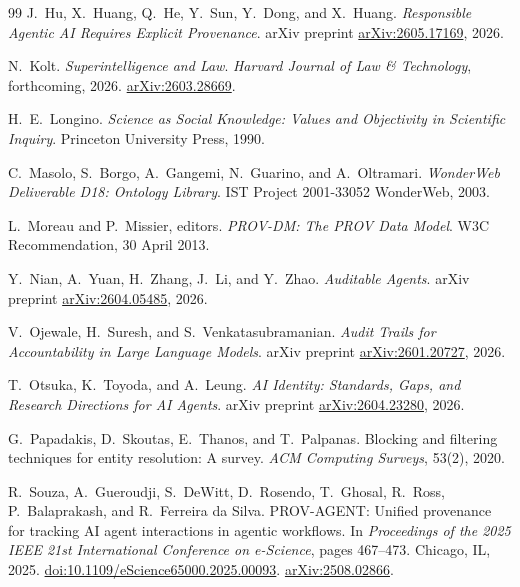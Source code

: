 \documentclass[11pt]{article}
\theoremstyle{plain}
\theoremstyle{definition}
\theoremstyle{remark}
\begin{document}
\begin{thebibliography}{99}
  J.\ Hu, X.\ Huang, Q.\ He, Y.\ Sun, Y.\ Dong, and X.\ Huang.
  \emph{Responsible Agentic AI Requires Explicit Provenance}.
  arXiv preprint \href{https://arxiv.org/abs/2605.17169}{arXiv:2605.17169}, 2026.

  N.\ Kolt.
  \emph{Superintelligence and Law}.
  \emph{Harvard Journal of Law \& Technology}, forthcoming, 2026.
  \href{https://arxiv.org/abs/2603.28669}{arXiv:2603.28669}.

  H.\ E.\ Longino.
  \emph{Science as Social Knowledge: Values and Objectivity in Scientific Inquiry}.
  Princeton University Press, 1990.

  C.\ Masolo, S.\ Borgo, A.\ Gangemi, N.\ Guarino, and A.\ Oltramari.
  \emph{WonderWeb Deliverable D18: Ontology Library}.
  IST Project 2001-33052 WonderWeb, 2003.

  L.\ Moreau and P.\ Missier, editors.
  \emph{PROV-DM: The PROV Data Model}.
  W3C Recommendation, 30 April 2013.

  Y.\ Nian, A.\ Yuan, H.\ Zhang, J.\ Li, and Y.\ Zhao.
  \emph{Auditable Agents}.
  arXiv preprint \href{https://arxiv.org/abs/2604.05485}{arXiv:2604.05485}, 2026.

  V.\ Ojewale, H.\ Suresh, and S.\ Venkatasubramanian.
  \emph{Audit Trails for Accountability in Large Language Models}.
  arXiv preprint \href{https://arxiv.org/abs/2601.20727}{arXiv:2601.20727}, 2026.

  T.\ Otsuka, K.\ Toyoda, and A.\ Leung.
  \emph{AI Identity: Standards, Gaps, and Research Directions for AI Agents}.
  arXiv preprint \href{https://arxiv.org/abs/2604.23280}{arXiv:2604.23280}, 2026.

  G.\ Papadakis, D.\ Skoutas, E.\ Thanos, and T.\ Palpanas.
  Blocking and filtering techniques for entity resolution: A survey.
  \emph{ACM Computing Surveys}, 53(2), 2020.

  R.\ Souza, A.\ Gueroudji, S.\ DeWitt, D.\ Rosendo, T.\ Ghosal, R.\ Ross, P.\ Balaprakash, and R.\ Ferreira da Silva.
  PROV-AGENT: Unified provenance for tracking AI agent interactions in agentic workflows.
  In \emph{Proceedings of the 2025 IEEE 21st International Conference on e-Science}, pages 467--473. Chicago, IL, 2025.
  \href{https://doi.org/10.1109/eScience65000.2025.00093}{doi:10.1109/eScience65000.2025.00093}.
  \href{https://arxiv.org/abs/2508.02866}{arXiv:2508.02866}.


\end{thebibliography}
\end{document}
